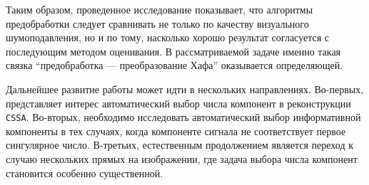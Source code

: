 Таким образом, проведенное исследование показывает, что алгоритмы
предобработки следует сравнивать не только по качеству визуального
шумоподавления, но и по тому, насколько хорошо результат согласуется с
последующим методом оценивания. В рассматриваемой задаче именно такая связка
``предобработка --- преобразование Хафа'' оказывается определяющей.

Дальнейшее развитие работы может идти в нескольких направлениях. Во-первых,
представляет интерес автоматический выбор числа компонент в реконструкции
\texttt{CSSA}. Во-вторых, необходимо исследовать автоматический выбор
информативной компоненты в тех случаях, когда компоненте сигнала не
соответствует первое сингулярное число. В-третьих, естественным продолжением
является переход к случаю нескольких прямых на изображении, где задача выбора
числа компонент становится особенно существенной.
